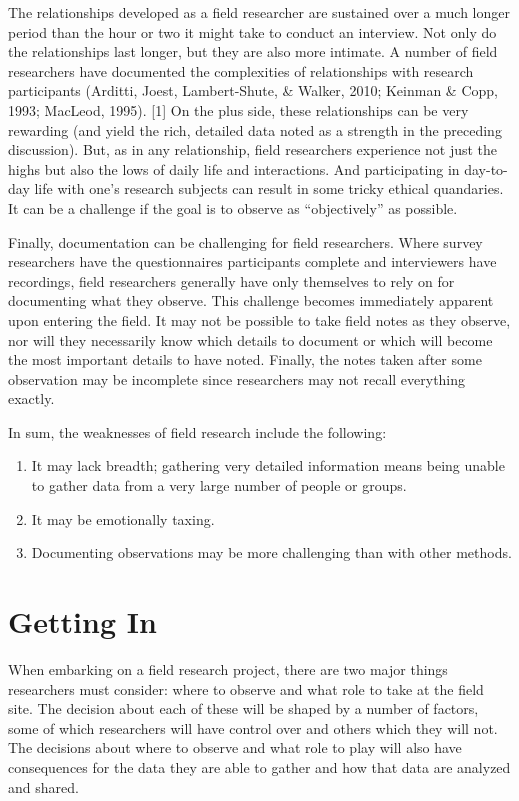 The relationships developed as a field researcher are sustained over a much longer period than the hour or two it might take to conduct an interview. Not only do the relationships last longer, but they are also more intimate. A number of field researchers have documented the complexities of relationships with research participants (Arditti, Joest, Lambert-Shute, \& Walker, 2010; Keinman \& Copp, 1993; MacLeod, 1995). [1] On the plus side, these relationships can be very rewarding (and yield the rich, detailed data noted as a strength in the preceding discussion). But, as in any relationship, field researchers experience not just the highs but also the lows of daily life and interactions. And participating in day-to-day life with one’s research subjects can result in some tricky ethical quandaries. It can be a challenge if the goal is to observe as ``objectively'' as possible.

Finally, documentation can be challenging for field researchers. Where survey researchers have the questionnaires participants complete and interviewers have recordings, field researchers generally have only themselves to rely on for documenting what they observe. This challenge becomes immediately apparent upon entering the field. It may not be possible to take field notes as they observe, nor will they necessarily know which details to document or which will become the most important details to have noted. Finally, the notes taken after some observation may be incomplete since researchers may not recall everything exactly.

In sum, the weaknesses of field research include the following:

\begin{enumerate}
	\item It may lack breadth; gathering very detailed information means being unable to gather data from a very large number of people or groups.
  \item It may be emotionally taxing.
	\item Documenting observations may be more challenging than with other methods.
\end{enumerate}

\section{Getting In}

When embarking on a field research project, there are two major things researchers must consider: where to observe and what role to take at the field site. The decision about each of these will be shaped by a number of factors, some of which researchers will have control over and others which they will not. The decisions about where to observe and what role to play will also have consequences for the data they are able to gather and how that data are analyzed and shared.

